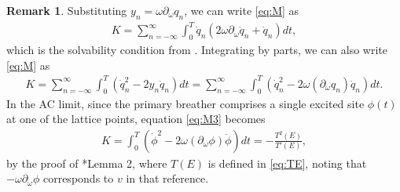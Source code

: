 \documentclass[12pt,reqno]{amsart}
\theoremstyle{definition}
\newtheorem{remark}{Remark}
\begin{document}
\begin{remark}\label{remark:solvability}
Substituting $y_n = \omega \partial_\omega q_n$, we can write \cref{eq:M} as 
\begin{align}\label{eq:M2}
K =
\sum_{n = -\infty}^\infty \int_0^T \dot{q}_n \left( 2 \omega \partial_\omega \dot{q}_n + \dot{q}_n \right) dt,
\end{align}
which is the solvability condition from \cite{kevrekidis2016}. Integrating by parts, we can also write \cref{eq:M} as 
\begin{align}\label{eq:M3}
K =
\sum_{n = -\infty}^\infty \int_0^T \left( \dot{q}_n^2 - 2 y_n \ddot{q}_n \right) dt =
\sum_{n = -\infty}^\infty \int_0^T \left( \dot{q}_n^2 - 2 \omega (\partial_\omega q_n) \ddot{q}_n \right) dt.
\end{align}
In the AC limit, since the primary breather comprises a single excited site $\phi(t)$ at one of the lattice points, equation \cref{eq:M3} becomes
\begin{align}\label{eq:MAC}
K = \int_0^T \left( \dot{\phi}^2 - 2 \omega(\partial_\omega \phi) \ddot{\phi} \right) dt = - \frac{T^2(E)}{T'(E)},
\end{align}
by the proof of \cite{Pelinovsky2012}*{Lemma 2}, where $T(E)$ is defined in \cref{eq:TE}, noting that $-\omega \partial_\omega \phi$ corresponds to $v$ in that reference.
\end{remark}
\end{document}
